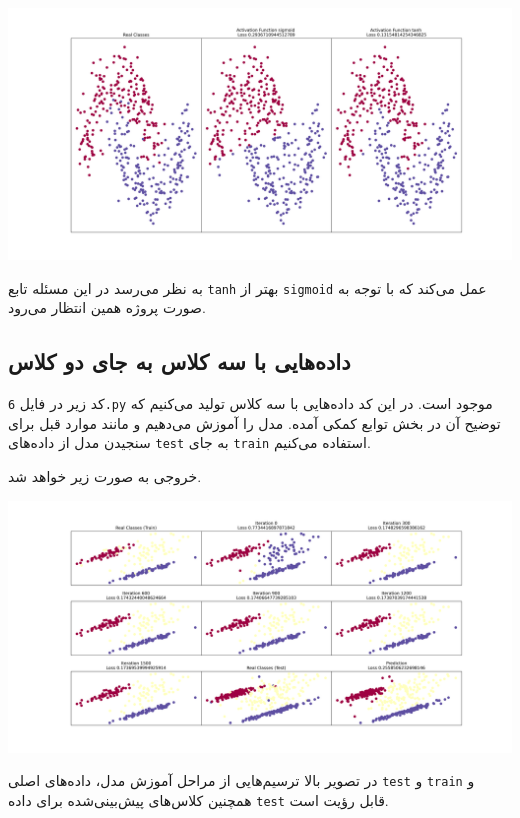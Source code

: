 \documentclass[a4paper, 12pt]{article}
\theoremstyle{definition}
\begin{document}
\begin{center}
    \includegraphics[width=\textwidth]{figs/5.png}
\end{center}

به نظر می‌رسد در این مسئله تابع
\texttt{tanh}
بهتر از
\texttt{sigmoid}
عمل می‌کند که با توجه به صورت پروژه همین انتظار می‌رود.

\subsection{داده‌هایی با سه کلاس به جای دو کلاس}
کد زیر در فایل
\texttt{6.py}
موجود است. در این کد داده‌هایی با سه کلاس تولید می‌کنیم که توضیح آن در بخش توابع کمکی آمده. مدل را آموزش می‌دهیم و مانند موارد قبل برای سنجیدن مدل از داده‌های
\texttt{test}
به جای
\texttt{train}
استفاده می‌کنیم.

\LTR

\RTL

خروجی به صورت زیر خواهد شد.

\begin{center}
    \includegraphics[width=\textwidth]{figs/6.png}
\end{center}

در تصویر بالا ترسیم‌هایی از مراحل آموزش مدل، داده‌های اصلی
\texttt{test}
و
\texttt{train}
و همچنین کلاس‌های پیش‌بینی‌شده برای داده
\texttt{test}
قابل رؤیت است.
\end{document}
